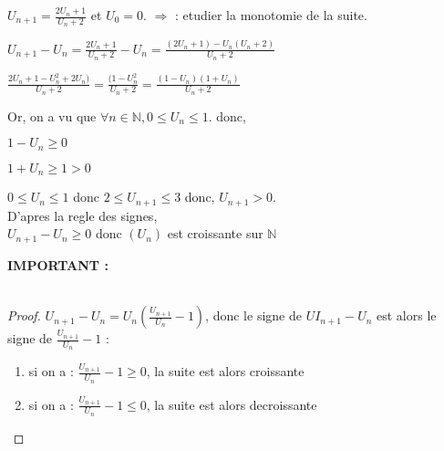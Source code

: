 \documentclass[a4paper,10pt]{book}
\begin{document}
		\exemple $U_{n+1} = \frac{2U_n + 1}{U_n +2}$ et $U_0 = 0$.
			$\Rightarrow$ : etudier la monotomie de la suite.\\
			\smallskip
			\begin{description}
				\item $U_{n+1} - U_n =  \frac{2U_n + 1}{U_n +2} - U_n = \frac{(2U_n + 1)- U_n(U_n +2)}{U_n +2}$
				\item $\frac{ 2U_n + 1 - U_n^2 +2U_n)}{U_n +2} = \frac{(1 - U_n^2}{U_n +2} = \frac{(1-U_n)(1+U_n)}{U_n +2}$\\
			\end{description}
			Or, on a vu que $\forall n \in \mathbb{N}, 0 \leq U_n \leq 1$.
			donc,\\
			\begin{description}
				\item $1 - U_n \geq 0$
				\item $1 + U_n \geq 1 > 0$
				\item $0 \leq U_n \leq 1$ donc $2 \leq U_{n+1} \leq 3$ donc, $U_{n+1} > 0$.\\
				D'apres la regle des signes,\\
				$U_{n+1} - U_n \geq 0$ donc $(U_n)$ est croissante sur $\mathbb{N}$
			\end{description}
			\smallskip
			\textbf{IMPORTANT :}\\

			\medskip\\

			\begin{proof}
					$U_{n+1} - U_n = U_n(\frac{U_{n+1}}{U_n} - 1)$, donc le signe de $UI_{n+1} - U_n$ est alors le signe de $\frac{U_{n+1}}{U_n} - 1$ :
					\begin{enumerate}
						\item si on a : $\frac{U_{n+1}}{U_n} - 1 \geq 0$, la suite est alors croissante
						\item si on a : $\frac{U_{n+1}}{U_n} - 1 \leq 0$, la suite est alors decroissante
					\end{enumerate}
			\end{proof}
\end{document}

